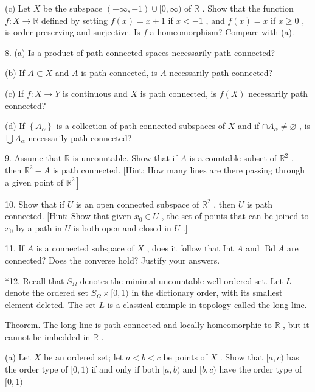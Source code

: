 \documentclass[10pt]{article}
\begin{document}
(c) Let \(X\) be the subspace \(\left( {-\infty , - 1}\right)  \cup  \lbrack 0,\infty )\) of \(\mathbb{R}\) . Show that the function \(f : X \rightarrow  \mathbb{R}\) defined by setting \(f\left( x\right)  = x + 1\) if \(x <  - 1\) , and \(f\left( x\right)  = x\) if \(x \geq  0\) , is order preserving and surjective. Is \(f\) a homeomorphism? Compare with (a).

8. (a) Is a product of path-connected spaces necessarily path connected?

(b) If \(A \subset  X\) and \(A\) is path connected, is \(\bar{A}\) necessarily path connected?

(c) If \(f : X \rightarrow  Y\) is continuous and \(X\) is path connected, is \(f\left( X\right)\) necessarily path connected?

(d) If \(\left\{  {A}_{\alpha }\right\}\) is a collection of path-connected subspaces of \(X\) and if \(\cap  {A}_{\alpha } \neq  \varnothing\) , is \(\bigcup {A}_{\alpha }\) necessarily path connected?

9. Assume that \(\mathbb{R}\) is uncountable. Show that if \(A\) is a countable subset of \({\mathbb{R}}^{2}\) , then \({\mathbb{R}}^{2} - A\) is path connected. [Hint: How many lines are there passing through a given point of \(\left. {\mathbb{R}}^{2}\right\rbrack\)

10. Show that if \(U\) is an open connected subspace of \({\mathbb{R}}^{2}\) , then \(U\) is path connected. [Hint: Show that given \({x}_{0} \in  U\) , the set of points that can be joined to \({x}_{0}\) by a path in \(U\) is both open and closed in \(U\) .]

11. If \(A\) is a connected subspace of \(X\) , does it follow that Int \(A\) and \(\operatorname{Bd}A\) are connected? Does the converse hold? Justify your answers.

*12. Recall that \({S}_{\Omega }\) denotes the minimal uncountable well-ordered set. Let \(L\) denote the ordered set \({S}_{\Omega } \times  \lbrack 0,1)\) in the dictionary order, with its smallest element deleted. The set \(L\) is a classical example in topology called the long line.

Theorem. The long line is path connected and locally homeomorphic to \(\mathbb{R}\) , but it cannot be imbedded in \(\mathbb{R}\) .

(a) Let \(X\) be an ordered set; let \(a < b < c\) be points of \(X\) . Show that \(\lbrack a,c)\) has the order type of \(\lbrack 0,1)\) if and only if both \(\lbrack a,b)\) and \(\lbrack b,c)\) have the order type of \(\lbrack 0,1)\)
\end{document}
